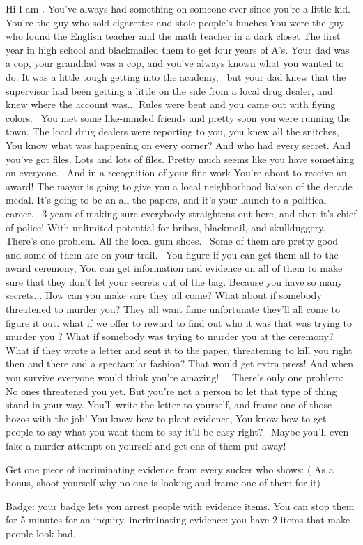 \documentclass[char]{GC2019}
\begin{document}
\name{\cMAC{}}

Hi I am \cPM{\intro}.
You've always had something on someone ever since you're a little kid. You're the guy who sold cigarettes and stole people's lunches.You were the guy who found the English teacher and the math teacher in a dark closet The first year in high school and blackmailed them to get four years of A's.
Your dad was a cop, your granddad was a cop, and you've always known what you wanted to do. It was a little tough getting into the academy,  but your dad knew that the supervisor had been getting a little on the side from a local drug dealer, and knew where the account was... Rules were bent and you came out with flying colors. 
You met some like-minded friends and pretty soon you were running the town. The local drug dealers were reporting to you, you knew all the snitches, You know what was happening on every corner? And who had every secret. And you've got files. Lots and lots of files.
Pretty much seems like you have something on everyone.  And in a recognition of your fine work You're about to receive an award! The mayor is going to give you a local neighborhood liaison of the decade medal. It's going to be an all the papers, and it's your launch to a political career.  3 years of making sure everybody straightens out here, and then it's chief of police! With unlimited potential for bribes, blackmail, and skullduggery. 
There's one problem. All the local gum shoes.  Some of them are pretty good and some of them are on your trail.  You figure if you can get them all to the award ceremony, You can get information and evidence on all of them to make sure that they don't let your secrets out of the bag. Because you have so many secrets...
How can you make sure they all come? What about if somebody threatened to murder you? They all want fame unfortunate they'll all come to figure it out. what if we offer to reward to find out who it was that was trying to murder you ? What if somebody was trying to murder you at the ceremony? What if they wrote a letter and sent it to the paper, threatening to kill you right then and there and a spectacular fashion? That would get extra press! And when you survive everyone would think you're amazing!  
There's only one problem: No ones threatened you yet. But you're not a person to let that type of thing stand in your way. You'll write the letter to yourself, and frame one of those bozos with the job! You know how to plant evidence, You know how to get people to say what you want them to say it'll be easy right? 
Maybe you'll even fake a murder attempt on yourself and get one of them put away!
\begin{itemz}[Goals]
Get one piece of incriminating evidence from every sucker who shows:
( As a bonus, shoot yourself why no one is looking and frame one of them for it) 
	\item 
	Badge: your badge lets you arrest people with evidence items. You can stop them for 5 minutes  for an inquiry. 
  incriminating evidence:  you have 2 items that make people look bad. 
\end{itemz}
\end{document}
